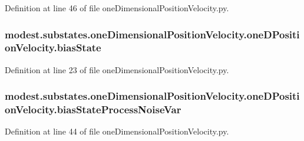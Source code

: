 Definition at line 46 of file one\+Dimensional\+Position\+Velocity.\+py.

\subsubsection[{\texorpdfstring{bias\+State}{biasState}}]{\setlength{\rightskip}{0pt plus 5cm}modest.\+substates.\+one\+Dimensional\+Position\+Velocity.\+one\+D\+Position\+Velocity.\+bias\+State}\hypertarget{classmodest_1_1substates_1_1oneDimensionalPositionVelocity_1_1oneDPositionVelocity_adfefff9b378df18fdb575973cdb6cb52}{}\label{classmodest_1_1substates_1_1oneDimensionalPositionVelocity_1_1oneDPositionVelocity_adfefff9b378df18fdb575973cdb6cb52}


Definition at line 23 of file one\+Dimensional\+Position\+Velocity.\+py.

\subsubsection[{\texorpdfstring{bias\+State\+Process\+Noise\+Var}{biasStateProcessNoiseVar}}]{\setlength{\rightskip}{0pt plus 5cm}modest.\+substates.\+one\+Dimensional\+Position\+Velocity.\+one\+D\+Position\+Velocity.\+bias\+State\+Process\+Noise\+Var}\hypertarget{classmodest_1_1substates_1_1oneDimensionalPositionVelocity_1_1oneDPositionVelocity_ac365e7ee6e0ca28406ec88129d286429}{}\label{classmodest_1_1substates_1_1oneDimensionalPositionVelocity_1_1oneDPositionVelocity_ac365e7ee6e0ca28406ec88129d286429}


Definition at line 44 of file one\+Dimensional\+Position\+Velocity.\+py.

